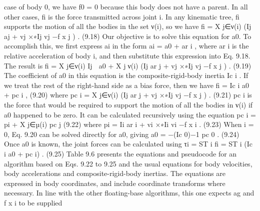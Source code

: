 case of body 0, we have f0 = 0 because this body does not have a parent. In all other cases, fi is the force transmitted across joint i. In any kinematic tree, fi supports the motion of all the bodies in the set ν(i), so we have fi = X j∈ν(i) (Ij aj + vj ×∗Ij vj −f x j ) . (9.18) Our objective is to solve this equation for a0. To accomplish this, we first express ai in the form ai = a0 + ar i , where ar i is the relative acceleration of body i, and then substitute this expression into Eq. 9.18. The result is fi =   X j∈ν(i) Ij  a0 + X j∈ν(i) (Ij ar j + vj ×∗Ij vj −f x j ) . (9.19) The coefficient of a0 in this equation is the composite-rigid-body inertia Ic i . If we treat the rest of the right-hand side as a bias force, then we have fi = Ic i a0 + pc i , (9.20) where pc i = X j∈ν(i) (Ij ar j + vj ×∗Ij vj −f x j ) . (9.21) pc i is the force that would be required to support the motion of all the bodies in ν(i) if a0 happened to be zero. It can be calculated recursively using the equation pc i = pi + X j∈µ(i) pc j (9.22) where pi = Ii ar i + vi ×∗Ii vi −f x i . (9.23) When i = 0, Eq. 9.20 can be solved directly for a0, giving a0 = −(Ic 0)−1 pc 0 . (9.24) Once a0 is known, the joint forces can be calculated using τi = ST i fi = ST i (Ic i a0 + pc i) . (9.25) Table 9.6 presents the equations and pseudocode for an algorithm based on Eqs. 9.22 to 9.25 and the usual equations for body velocities, body accelerations and composite-rigid-body inertias. The equations are expressed in body coordinates, and include coordinate transforms where necessary. In line with the other floating-base algorithms, this one expects ag and f x i to be supplied

